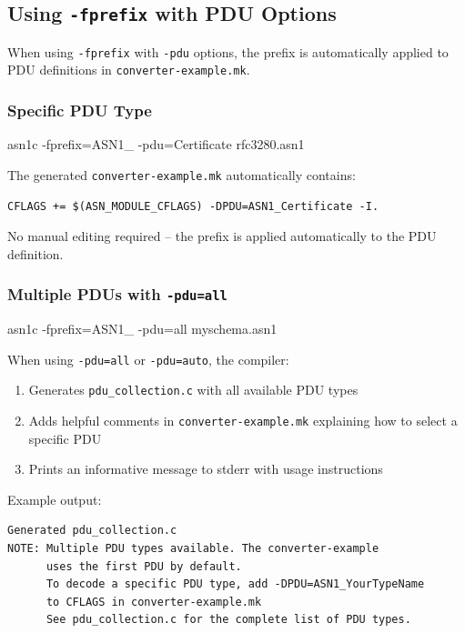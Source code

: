 \documentclass[english,oneside,12pt]{book}
\begin{document}
\subsection*{Using \texttt{-fprefix} with PDU Options}

When using \texttt{-fprefix} with \texttt{-pdu} options, the prefix is automatically 
applied to PDU definitions in \texttt{converter-example.mk}.

\subsubsection*{Specific PDU Type}

\begin{bash}
asn1c -fprefix=ASN1_ -pdu=Certificate rfc3280.asn1
\end{bash}

The generated \texttt{converter-example.mk} automatically contains:
\begin{verbatim}
CFLAGS += $(ASN_MODULE_CFLAGS) -DPDU=ASN1_Certificate -I.
\end{verbatim}

No manual editing required -- the prefix is applied automatically to the PDU definition.

\subsubsection*{Multiple PDUs with \texttt{-pdu=all}}

\begin{bash}
asn1c -fprefix=ASN1_ -pdu=all myschema.asn1
\end{bash}

When using \texttt{-pdu=all} or \texttt{-pdu=auto}, the compiler:
\begin{enumerate}
\item Generates \texttt{pdu\_collection.c} with all available PDU types
\item Adds helpful comments in \texttt{converter-example.mk} explaining how to select a specific PDU
\item Prints an informative message to stderr with usage instructions
\end{enumerate}

Example output:
\begin{verbatim}
Generated pdu_collection.c
NOTE: Multiple PDU types available. The converter-example 
      uses the first PDU by default.
      To decode a specific PDU type, add -DPDU=ASN1_YourTypeName 
      to CFLAGS in converter-example.mk
      See pdu_collection.c for the complete list of PDU types.
\end{verbatim}
\end{document}
